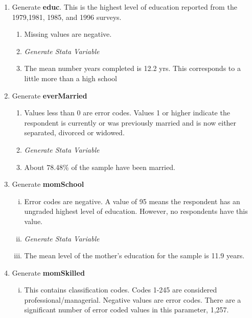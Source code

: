 \documentclass[12pt]{article}
\begin{document}
\begin{enumerate}[\indent a.]
    \item Generate \textbf{educ}.  This is the highest level of education 
    reported from the 1979,1981, 1985, and 1996 surveys.
    \begin{enumerate}
        \item Missing values are negative.
        
        \item \textit{Generate Stata Variable}

        \item The mean number years completed is 12.2 yrs.  This corresponds to 
        a little more than a high school
    \end{enumerate}

    \item Generate \textbf{everMarried}
    \begin{enumerate}
        \item Values less than 0 are error codes. Values 1 or higher indicate 
        the respondent is currently or was previously married and is now either 
        separated, divorced or widowed.

        \item \textit{Generate Stata Variable}
        
        \item About 78.48\% of the sample have been married.
    \end{enumerate}    
    
    \item Generate \textbf{momSchool}
    \begin{enumerate}[(i)]
        \item Error codes are negative.  A value of 95 means the respondent has 
        an ungraded highest level of education.  However, no respondents have 
        this value.

        \item \textit{Generate Stata Variable}
        
        \item The mean level of the mother's education for the sample is 11.9 
        years.  
    \end{enumerate}

    \item Generate \textbf{momSkilled}
    \begin{enumerate}[(i)]
        \item This contains classification codes.  Codes 1-245 are considered 
        professional/managerial. Negative values are error codes. There are a
        significant number of error coded values in this parameter, 1,257. 


\end{enumerate}
\end{enumerate}
\end{document}
